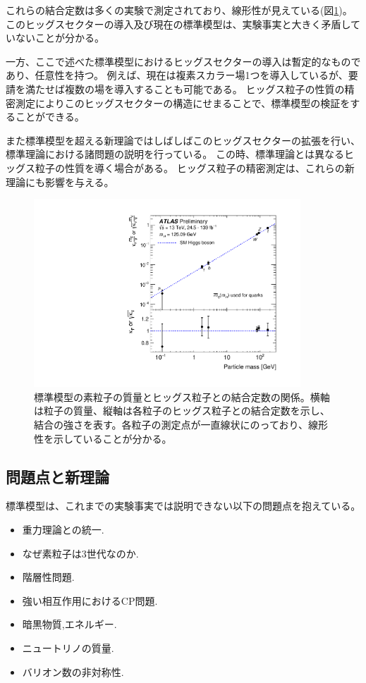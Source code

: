 これらの結合定数は多くの実験で測定されており、線形性が見えている(図\ref{kappa_vs_mass})。
このヒッグスセクターの導入及び現在の標準模型は、実験事実と大きく矛盾していないことが分かる。

一方、ここで述べた標準模型におけるヒッグスセクターの導入は暫定的なものであり、任意性を持つ。
例えば、現在は複素スカラー場1つを導入しているが、要請を満たせば複数の場を導入することも可能である。
ヒッグス粒子の性質の精密測定によりこのヒッグスセクターの構造にせまることで、標準模型の検証をすることができる。

また標準模型を超える新理論ではしばしばこのヒッグスセクターの拡張を行い、標準理論における諸問題の説明を行っている。
この時、標準理論とは異なるヒッグス粒子の性質を導く場合がある。
ヒッグス粒子の精密測定は、これらの新理論にも影響を与える。

\begin{figure}[bpt]\centering
\includegraphics[width=10cm,angle=270]{./kappa_vs_mass.pdf}
\caption[標準模型の素粒子の質量とヒッグス粒子との結合定数の関係]{標準模型の素粒子の質量とヒッグス粒子との結合定数の関係\cite{1-10}。横軸は粒子の質量、縦軸は各粒子のヒッグス粒子との結合定数を示し、結合の強さを表す。各粒子の測定点が一直線状にのっており、線形性を示していることが分かる。}
\label{kappa_vs_mass}
\end{figure}

\subsection{問題点と新理論}
標準模型は、これまでの実験事実では説明できない以下の問題点を抱えている。
\begin{itemize}
  \item 重力理論との統一.
  \item なぜ素粒子は3世代なのか.
  \item 階層性問題.
  \item 強い相互作用におけるCP問題.
  \item 暗黒物質,エネルギー.
  \item ニュートリノの質量.
  \item バリオン数の非対称性.
\end{itemize}

